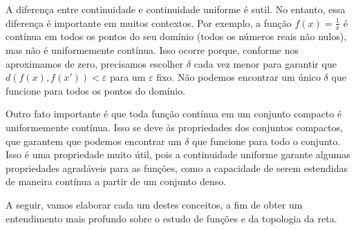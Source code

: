\documentclass[analysis_notes.tex]{subfiles}
\begin{document}
A diferença entre continuidade e continuidade uniforme é sutil. No entanto, essa diferença é importante em muitos contextos.
Por exemplo, a função $f(x) = \frac{1}{x}$ é contínua em todos os pontos do seu domínio (todos os números reais não nulos),
mas não é uniformemente contínua. Isso ocorre porque, conforme nos aproximamos de zero, precisamos escolher $\delta$ cada vez
menor para garantir que $d(f(x), f(x')) < \varepsilon$ para um $\varepsilon$ fixo. Não podemos encontrar um único $\delta$ que
funcione para todos os pontos do domínio.

Outro fato importante é que toda função contínua em um conjunto compacto é uniformemente contínua. Isso se deve às propriedades
dos conjuntos compactos, que garantem que podemos encontrar um $\delta$ que funcione para todo o conjunto. Isso é uma
propriedade muito útil, pois a continuidade uniforme garante algumas propriedades agradáveis para as funções, como a
capacidade de serem estendidas de maneira contínua a partir de um conjunto denso.

A seguir, vamos elaborar cada um destes conceitos, a fim de obter um entendimento mais profundo sobre o estudo de funções e da
topologia da reta.
\end{document}
